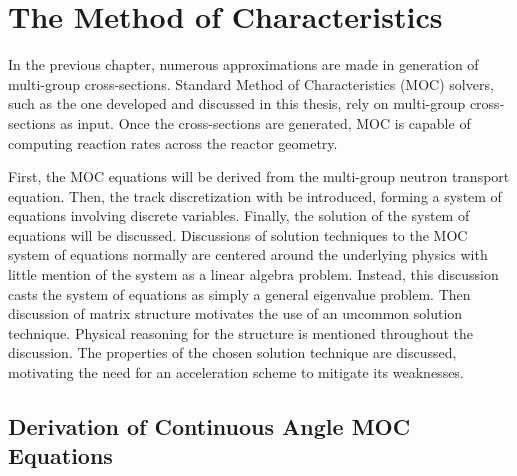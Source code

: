 \chapter{The Method of Characteristics}
\label{chap:moc}

In the previous chapter, numerous approximations are made in generation of multi-group cross-sections. Standard Method of Characteristics (MOC) solvers, such as the one developed and discussed in this thesis, rely on multi-group cross-sections as input. Once the cross-sections are generated, MOC is capable of computing reaction rates across the reactor geometry.

First, the MOC equations will be derived from the multi-group neutron transport equation. Then, the track discretization with be introduced, forming a system of equations involving discrete variables. Finally, the solution of the system of equations will be discussed. Discussions of solution techniques to the MOC system of equations normally are centered around the underlying physics with little mention of the system as a linear algebra problem. Instead, this discussion casts the system of equations as simply a general eigenvalue problem. Then discussion of matrix structure motivates the use of an uncommon solution technique. Physical reasoning for the structure is mentioned throughout the discussion. The properties of the chosen solution technique are discussed, motivating the need for an acceleration scheme to mitigate its weaknesses.


\section{Derivation of Continuous Angle MOC Equations}
\label{sec:chap3-mc-overview}

